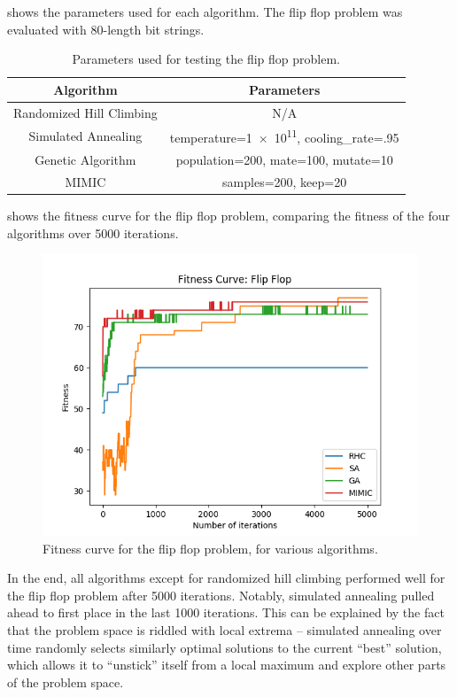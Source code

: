 \documentclass{article}
\begin{document}
       shows the parameters used for each algorithm. The flip flop problem was evaluated with 80-length bit strings.

      \begin{table}[h!]
      \centering
        \begin{tabular}{||c|c||}\hline
          \textbf{Algorithm} & \textbf{Parameters} \\ \hline
          Randomized Hill Climbing & N/A \\ \hline
          Simulated Annealing & temperature=\num{1e11}, cooling\_rate=.95 \\ \hline
          Genetic Algorithm & population=200, mate=100, mutate=10 \\ \hline
          MIMIC & samples=200, keep=20 \\ \hline
        \end{tabular}

        \caption{Parameters used for testing the flip flop problem.}
        \label{tab:ff-params}
      \end{table}

       shows the fitness curve for the flip flop problem, comparing the fitness of the four algorithms over 5000 iterations.

      \begin{figure}[htb]
      \centering
      \includegraphics[width=.5\linewidth]{out/op/flipflop/fitness.png}
      \caption{Fitness curve for the flip flop problem, for various algorithms.}
      \label{fig:fitness-ff}
      \end{figure}

      In the end, all algorithms except for randomized hill climbing performed well for the flip flop problem after 5000 iterations. Notably, simulated annealing pulled ahead to first place in the last 1000 iterations. This can be explained by the fact that the problem space is riddled with local extrema -- simulated annealing over time randomly selects similarly optimal solutions to the current ``best'' solution, which allows it to ``unstick'' itself from a local maximum and explore other parts of the problem space.
\end{document}
